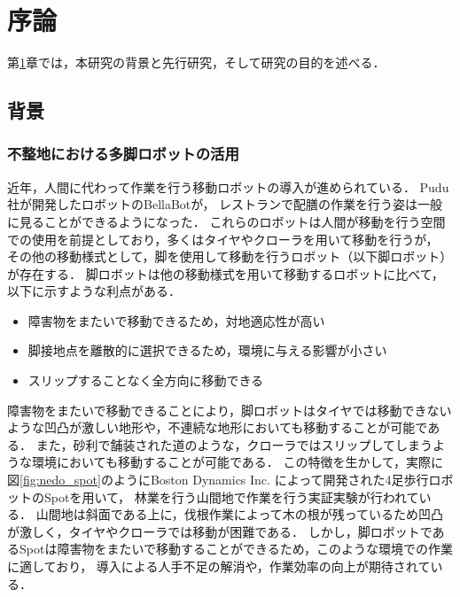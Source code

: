 ﻿
\chapter{序論}\label{chapter:序論}
第\ref{chapter:序論}章では，本研究の背景と先行研究，そして研究の目的を述べる．


\section{背景}


\subsection{不整地における多脚ロボットの活用}
近年，人間に代わって作業を行う移動ロボットの導入が進められている\cite{Sotnik_Prospects_for_Introduction}．
Pudu社が開発したロボットのBellaBot\cite{Pudu_BellaBot}が，
レストランで配膳の作業を行う姿は一般に見ることができるようになった．
これらのロボットは人間が移動を行う空間での使用を前提としており，多くはタイヤやクローラを用いて移動を行うが，
その他の移動様式として，脚を使用して移動を行うロボット（以下脚ロボット）が存在する．
脚ロボットは他の移動様式を用いて移動するロボットに比べて，
以下に示すような利点がある\cite{Locomotion_for_difficult_terrain}．

\begin{itemize}
  \item 障害物をまたいで移動できるため，対地適応性が高い
  \item 脚接地点を離散的に選択できるため，環境に与える影響が小さい
  \item スリップすることなく全方向に移動できる
\end{itemize}

障害物をまたいで移動できることにより，脚ロボットはタイヤでは移動できないような凹凸が激しい地形や，不連続な地形においても移動することが可能である．
また，砂利で舗装された道のような，クローラではスリップしてしまうような環境においても移動することが可能である．
この特徴を生かして，実際に図\ref{fig:nedo_spot}のようにBoston Dynamics Inc. によって開発された4足歩行ロボットのSpot\cite{Boston_Dynamics_Spot}を用いて，
林業を行う山間地で作業を行う実証実験が行われている\cite{NEDO}．
山間地は斜面である上に，伐根作業によって木の根が残っているため凹凸が激しく，タイヤやクローラでは移動が困難である．
しかし，脚ロボットであるSpotは障害物をまたいで移動することができるため，このような環境での作業に適しており，
導入による人手不足の解消や，作業効率の向上が期待されている．

